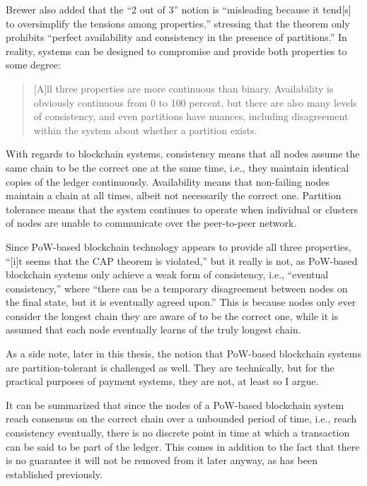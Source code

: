 Brewer also added that the ``2 out of 3'' notion is ``misleading because it tend[s] to oversimplify the tensions among properties,'' stressing that the theorem only prohibits ``perfect availability and consistency in the presence of partitions.'' \autocite{infoq2012caplater}
In reality, systems can be designed to compromise and provide both properties to some degree: \autocite{infoq2012caplater}

\begin{quote}
	[A]ll three properties are more continuous than binary.
	Availability is obviously continuous from 0 to 100 percent, but there are also many levels of consistency, and even partitions have nuances, including disagreement within the system about whether a partition exists.
\end{quote}

With regards to blockchain systems, consistency means that all nodes assume the same chain to be the correct one at the same time, i.e., they maintain identical copies of the ledger continuously.
Availability means that non-failing nodes maintain a chain at all times, albeit not necessarily the correct one.
Partition tolerance means that the system continues to operate when individual or clusters of nodes are unable to communicate over the peer-to-peer network.

Since PoW-based blockchain technology appears to provide all three properties, ``[i]t seems that the CAP theorem is violated,'' but it really is not, as PoW-based blockchain systems only achieve a weak form of consistency, i.e., ``eventual consistency,'' where ``there can be a temporary disagreement between nodes on the final state, but it is eventually agreed upon.'' \autocite{bashir2020}
This is because nodes only ever consider the longest chain they are aware of to be the correct one, while it is assumed that each node eventually learns of the truly longest chain.

As a side note, later in this thesis, the notion that PoW-based blockchain systems are partition-tolerant is challenged as well.
They are technically, but for the practical purposes of payment systems, they are not, at least so I argue.

It can be summarized that since the nodes of a PoW-based blockchain system reach consensus on the correct chain over a unbounded period of time, i.e., reach consistency eventually, there is no discrete point in time at which a transaction can be said to be part of the ledger.
This comes in addition to the fact that there is no guarantee it will not be removed from it later anyway, as has been established previously.

